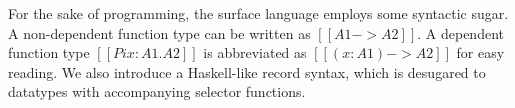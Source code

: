 
For the sake of programming, the surface language employs some
syntactic sugar. A non-dependent function type can be written as
$[[A1 -> A2]]$. A dependent function type $[[Pi x : A1 . A2]]$ is
abbreviated as $[[(x : A1) -> A2]]$ for easy reading. We also
introduce a Haskell-like record syntax, which is desugared to
datatypes with accompanying selector functions.


